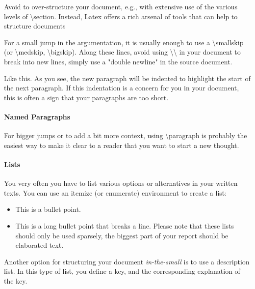 
Avoid to over-structure your document, e.g., with extensive use of the various levels of \textbackslash{}section.
Instead, Latex offers a rich arsenal of tools that can help to structure documents

\smallskip
For a small jump in the argumentation, it is usually enough to use a \textbackslash{}smallskip (or \textbackslash{}medskip, \textbackslash{}bigskip).
Along these lines, avoid using \textbackslash{}\textbackslash{} in your document to break into new lines, simply use a "double newline" in the source document.

Like this. As you see, the new paragraph will be indented to highlight the start of the next paragraph.
If this indentation is a concern for you in your document, this is often a sign that your paragraphs are too short.



\paragraph{Named Paragraphs}
For bigger jumps or to add a bit more context, using \textbackslash{}paragraph is probably the easiest way to make it clear to a reader that you want to start a new thought.


\paragraph{Lists}

You very often you have to list various options or alternatives in your written texts.
You can use an itemize (or enumerate) environment to create a list:

\begin{itemize} %
\item This is a bullet point.
\item This is a long bullet point that breaks a line. Please note that these lists should only be used sparsely, the biggest part of your report should be elaborated text.
\end{itemize} %

Another option for structuring your document \emph{in-the-small} is to use a description list.
In this type of list, you define a key, and the corresponding explanation of the key.

